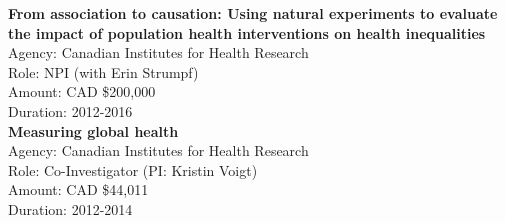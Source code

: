\documentclass[
  letterpaper,
  DIV=11,
  numbers=noendperiod]{scrartcl}
\begin{document}
\textbf{From association to causation: Using natural experiments to
evaluate the impact of population health interventions on health
inequalities}\\
\hspace*{0.333em}\hspace*{0.333em}\hspace*{0.333em}\hspace*{0.333em}Agency:
Canadian Institutes for Health Research\\
\hspace*{0.333em}\hspace*{0.333em}\hspace*{0.333em}\hspace*{0.333em}Role:
NPI (with Erin Strumpf)\\
\hspace*{0.333em}\hspace*{0.333em}\hspace*{0.333em}\hspace*{0.333em}Amount:
CAD \$200,000\\
\hspace*{0.333em}\hspace*{0.333em}\hspace*{0.333em}\hspace*{0.333em}Duration:
2012-2016\\

\textbf{Measuring global health}\\
\hspace*{0.333em}\hspace*{0.333em}\hspace*{0.333em}\hspace*{0.333em}Agency:
Canadian Institutes for Health Research\\
\hspace*{0.333em}\hspace*{0.333em}\hspace*{0.333em}\hspace*{0.333em}Role:
Co-Investigator (PI: Kristin Voigt)\\
\hspace*{0.333em}\hspace*{0.333em}\hspace*{0.333em}\hspace*{0.333em}Amount:
CAD \$44,011\\
\hspace*{0.333em}\hspace*{0.333em}\hspace*{0.333em}\hspace*{0.333em}Duration:
2012-2014\\
\end{document}
